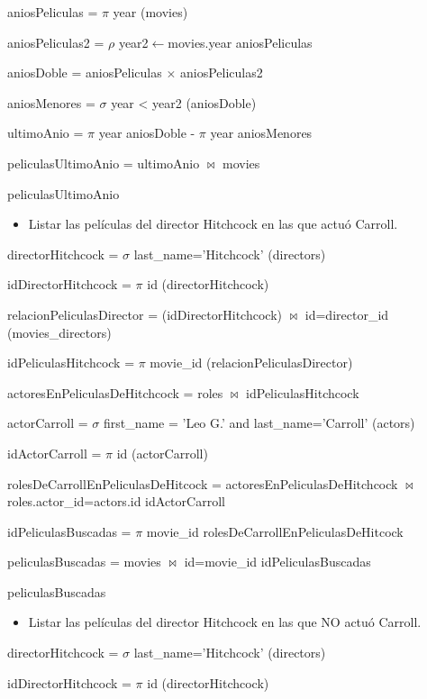 aniosPeliculas = $\pi$ year (movies)

aniosPeliculas2 = $\rho$ year2$\leftarrow$movies.year aniosPeliculas

aniosDoble = aniosPeliculas $\times$ aniosPeliculas2

aniosMenores = $\sigma$ year < year2 (aniosDoble)

ultimoAnio = $\pi$ year aniosDoble - $\pi$ year aniosMenores

peliculasUltimoAnio = ultimoAnio $\bowtie$ movies

peliculasUltimoAnio

\begin{itemize}
\item Listar las películas del director Hitchcock en las que actuó Carroll.
\end{itemize}


directorHitchcock = $\sigma$ last\_name='Hitchcock' (directors)

idDirectorHitchcock = $\pi$ id (directorHitchcock)

relacionPeliculasDirector = (idDirectorHitchcock) $\bowtie$ id=director\_id (movies\_directors)

idPeliculasHitchcock = $\pi$ movie\_id (relacionPeliculasDirector)

actoresEnPeliculasDeHitchcock = roles $\bowtie$ idPeliculasHitchcock

actorCarroll = $\sigma$ first\_name = 'Leo G.' and last\_name='Carroll' (actors)

idActorCarroll = $\pi$ id (actorCarroll)

rolesDeCarrollEnPeliculasDeHitcock = actoresEnPeliculasDeHitchcock $\bowtie$ roles.actor\_id=actors.id idActorCarroll

idPeliculasBuscadas = $\pi$ movie\_id rolesDeCarrollEnPeliculasDeHitcock

peliculasBuscadas = movies $\bowtie$ id=movie\_id idPeliculasBuscadas

peliculasBuscadas



\begin{itemize}
\item Listar las películas del director Hitchcock en las que NO actuó Carroll.
\end{itemize}

directorHitchcock = $\sigma$ last\_name='Hitchcock' (directors)

idDirectorHitchcock = $\pi$ id (directorHitchcock)

